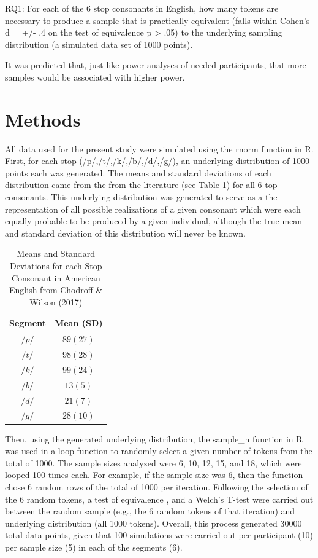\documentclass[
  a4paper,
  11pt,
  twocolumn]{article}
\begin{document}
RQ1: For each of the 6 stop consonants in English, how many tokens are
necessary to produce a sample that is practically equivalent (falls
within Cohen's d = +/- .4 on the test of equivalence p \textgreater{}
.05) to the underlying sampling distribution (a simulated data set of
1000 points).

It was predicted that, just like power analyses of needed participants,
that more samples would be associated with higher power.

\section{Methods}

All data used for the present study were simulated using the rnorm
function in R. First, for each stop (/p/,/t/,/k/,/b/,/d/,/g/), an
underlying distribution of 1000 points each was generated. The means and
standard deviations of each distribution came from the from the
literature (see Table \ref{tab:stim}) \cite{chodroff2017structure} for
all 6 top consonants. This underlying distribution was generated to
serve as a the representation of all possible realizations of a given
consonant which were each equally probable to be produced by a given
individual, although the true mean and standard deviation of this
distribution will never be known.

\begin{table}[!ht]
  \caption{Means and Standard Deviations for each Stop Consonant in American English from Chodroff \& Wilson (2017)}
  \label{tab:stim}
  \begin{center}
  \begin{tabular}{|c|c|}
  \hline
  \rowcolor[gray]{.75}
  Segment    & Mean (SD) \\
  \hline
  $/p/$    & $89 (27)$      \\
  $/t/$    & $98 (28)$      \\
  $/k/$   & $99 (24)$     \\
  $/b/$   & $13 (5)$    \\
  $/d/$   & $21 (7)$     \\
  $/g/$  & $28 (10)$     \\
  \hline
  \end{tabular}
  \end{center}
\end{table}

Then, using the generated underlying distribution, the sample\_n
function in R was used in a loop function to randomly select a given
number of tokens from the total of 1000. The sample sizes analyzed were
6, 10, 12, 15, and 18, which were looped 100 times each. For example, if
the sample size was 6, then the function chose 6 random rows of the
total of 1000 per iteration. Following the selection of the 6 random
tokens, a test of equivalence \cite{lakens2017equivalence}, and a
Welch's T-test were carried out between the random sample (e.g., the 6
random tokens of that iteration) and underlying distribution (all 1000
tokens). Overall, this process generated 30000 total data points, given
that 100 simulations were carried out per participant (10) per sample
size (5) in each of the segments (6).
\end{document}
